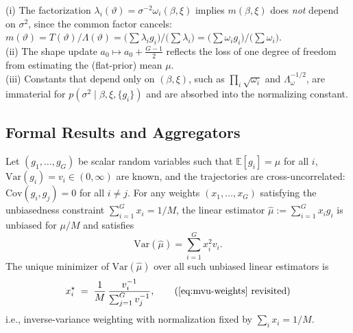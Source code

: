 \begin{remark}
(i) The factorization $\lambda_i(\vartheta)=\sigma^{-2}\omega_i(\beta,\xi)$ implies $m(\beta,\xi)$ does \emph{not} depend on $\sigma^2$, since the common factor cancels: $m(\vartheta)=T(\vartheta)/\Lambda(\vartheta)=\big(\sum \lambda_i g_i\big)/\big(\sum \lambda_i\big)=\big(\sum \omega_i g_i\big)/\big(\sum \omega_i\big)$. \\
(ii) The shape update $a_0\mapsto a_0+\frac{G-1}{2}$ reflects the loss of one degree of freedom from estimating the (flat-prior) mean $\mu$. \\
(iii) Constants that depend only on $(\beta,\xi)$, such as $\prod_i \sqrt{\omega_i}$ and $\Lambda_\omega^{-1/2}$, are immaterial for $p(\sigma^2\mid\beta,\xi,\{g_i\})$ and are absorbed into the normalizing constant.
\end{remark}

\subsection{Formal Results and Aggregators}\label{subsec:formal-results}

\begin{lemma}\label{lem:mvu}
Let $(g_1,\dots,g_G)$ be scalar random variables such that $\mathbb{E}[g_i]=\mu$ for all $i$,
$\mathrm{Var}(g_i)=v_i\in(0,\infty)$ are known, and the trajectories are cross-uncorrelated:
$\mathrm{Cov}(g_i,g_j)=0$ for all $i\neq j$.
For any weights $(x_1,\dots,x_G)$ satisfying the unbiasedness constraint $\sum_{i=1}^G x_i = 1/M$,
the linear estimator $\widehat{\mu}:=\sum_{i=1}^G x_i g_i$ is unbiased for $\mu/M$ and satisfies
\[
\mathrm{Var}(\widehat{\mu})=\sum_{i=1}^G x_i^2 v_i.
\]
The unique minimizer of $\mathrm{Var}(\widehat{\mu})$ over all such unbiased linear estimators is
\begin{equation}
  x_i^\star \;=\; \frac{1}{M}\,\frac{v_i^{-1}}{\sum_{j=1}^G v_j^{-1}},
  \tag{\ref{eq:mvu-weights} revisited}
\end{equation}
i.e., inverse-variance weighting with normalization fixed by $\sum_i x_i=1/M$.
\end{lemma}

